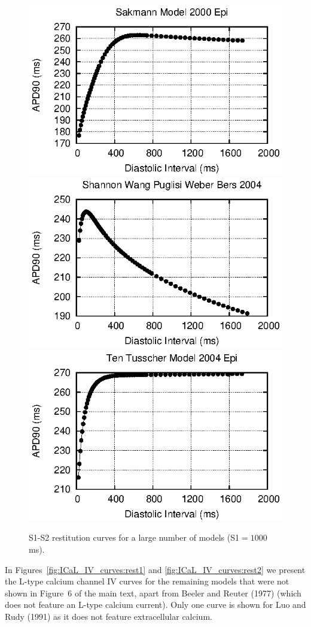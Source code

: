 \documentclass[preprint,authoryear,12pt]{elsarticle}
\begin{document}
\begin{figure}
\begin{center}
\includegraphics[width=0.32\linewidth]{sakmann_model_2000_epi_s1s2_curve}
\includegraphics[width=0.32\linewidth]{shannon_wang_puglisi_weber_bers_2004_s1s2_curve}
\includegraphics[width=0.32\linewidth]{ten_tusscher_model_2004_epi_s1s2_curve}
\caption{S1-S2 restitution curves for a large number of models (S1$ = 1000$ms).}
\label{fig:S1S2_Curves:rest2}
\end{center}
\end{figure}

In Figures~\ref{fig:ICaL_IV_curves:rest1} and \ref{fig:ICaL_IV_curves:rest2} we present the L-type calcium channel IV curves for the remaining models that were not shown in Figure~6 of the main text, apart from Beeler and Reuter (1977) (which does not feature an L-type calcium current). Only one curve is shown for Luo and Rudy (1991) as it does not feature extracellular calcium.
\end{document}
